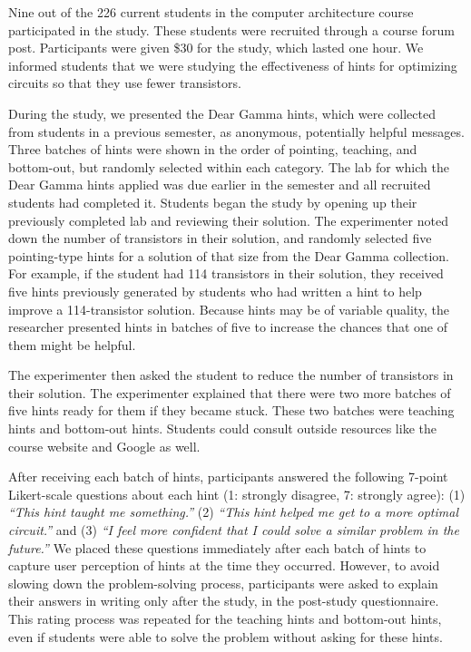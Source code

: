 Nine out of the 226 current students in the computer architecture course participated in the study. These students were recruited through a course forum post. Participants were given \$30 for the study, which lasted one hour. We informed students that we were studying the effectiveness of hints for optimizing circuits so that they use fewer transistors.

During the study, we presented the Dear Gamma hints, which were collected from students in a previous semester, as anonymous, potentially helpful messages. Three batches of hints were shown in the order of pointing, teaching, and bottom-out, but randomly selected within each category. The lab for which the Dear Gamma hints applied was due earlier in the semester and all recruited students had completed it. Students began the study by opening up their previously completed lab and reviewing their solution. The experimenter noted down the number of transistors in their solution, and randomly selected five pointing-type hints for a solution of that size from the Dear Gamma collection. For example, if the student had 114 transistors in their solution, they received five hints previously generated by students who had written a hint to help improve a 114-transistor solution. Because hints may be of variable quality, the researcher presented hints in batches of five to increase the chances that one of them might be helpful.

The experimenter then asked the student to reduce the number of transistors in their solution. The experimenter explained that there were two more batches of five hints ready for them if they became stuck. These two batches were teaching hints and bottom-out hints. Students could consult outside resources like the course website and Google as well. 

After receiving each batch of hints, participants answered the following 7-point Likert-scale questions about each hint (1: strongly disagree, 7: strongly agree): (1) {\it ``This hint taught me something.''} (2) {\it ``This hint helped me get to a more optimal circuit.''} and (3) {\it ``I feel more confident that I could solve a similar problem in the future.''} We placed these questions immediately after each batch of hints to capture user perception of hints at the time they occurred. However, to avoid slowing down the problem-solving process, participants were asked to explain their answers in writing only after the study, in the post-study questionnaire. This rating process was repeated for the teaching hints and bottom-out hints, even if students were able to solve the problem without asking for these hints.


